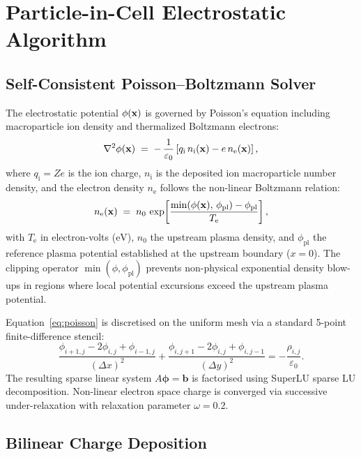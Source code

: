 \documentclass[11pt,a4paper]{article}
\begin{document}
\section{Particle-in-Cell Electrostatic Algorithm}

\subsection{Self-Consistent Poisson--Boltzmann Solver}

The electrostatic potential $\phi(\vb{x})$ is governed by Poisson's equation including macroparticle ion density and thermalized Boltzmann electrons:
\begin{equation}
    \nabla^{2}\phi(\vb{x}) \;=\; -\,\frac{1}{\varepsilon_{0}}
        \left[ q_{\mathrm{i}}\,n_{\mathrm{i}}(\vb{x}) - e\,n_{\mathrm{e}}(\vb{x}) \right],
    \label{eq:poisson}
\end{equation}
where $q_{\mathrm{i}} = Z e$ is the ion charge, $n_{\mathrm{i}}$ is the deposited ion macroparticle number density, and the electron density $n_{\mathrm{e}}$ follows the non-linear Boltzmann relation:
\begin{equation}
    n_{\mathrm{e}}(\vb{x}) \;=\; n_{0}\,
    \exp\!\left[\frac{\min(\phi(\vb{x}),\,\phi_{\mathrm{pl}}) - \phi_{\mathrm{pl}}}{T_{\mathrm{e}}}\right],
    \label{eq:boltzmann}
\end{equation}
with $T_{\mathrm{e}}$ in electron-volts ($\si{\eV}$), $n_0$ the upstream plasma density, and $\phi_{\mathrm{pl}}$ the reference plasma potential established at the upstream boundary ($x = 0$). The clipping operator $\min(\phi, \phi_{\mathrm{pl}})$ prevents non-physical exponential density blow-ups in regions where local potential excursions exceed the upstream plasma potential.

Equation~\eqref{eq:poisson} is discretised on the uniform mesh via a standard 5-point finite-difference stencil:
\begin{equation}
    \frac{\phi_{i+1,j} - 2\phi_{i,j} + \phi_{i-1,j}}{(\Delta x)^2} +
    \frac{\phi_{i,j+1} - 2\phi_{i,j} + \phi_{i,j-1}}{(\Delta y)^2}
    = -\frac{\rho_{i,j}}{\varepsilon_{0}}.
\end{equation}
The resulting sparse linear system $A \boldsymbol{\phi} = \mathbf{b}$ is factorised using SuperLU sparse LU decomposition. Non-linear electron space charge is converged via successive under-relaxation with relaxation parameter $\omega = 0.2$.

\subsection{Bilinear Charge Deposition}
\end{document}
